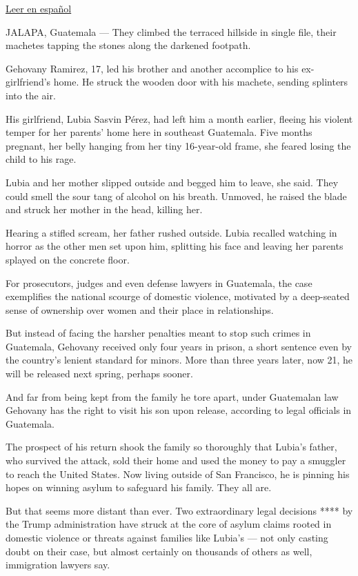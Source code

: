 \href{https://www.nytimes.com/es/2019/08/19/espanol/america-latina/guatemala-migrantes-mujeres-violencia.html}{Leer
en español}

JALAPA, Guatemala --- They climbed the terraced hillside in single file,
their machetes tapping the stones along the darkened footpath.

Gehovany Ramirez, 17, led his brother and another accomplice to his
ex-girlfriend's home. He struck the wooden door with his machete,
sending splinters into the air.

His girlfriend, Lubia Sasvin Pérez, had left him a month earlier,
fleeing his violent temper for her parents' home here in southeast
Guatemala. Five months pregnant, her belly hanging from her tiny
16-year-old frame, she feared losing the child to his rage.

Lubia and her mother slipped outside and begged him to leave, she said.
They could smell the sour tang of alcohol on his breath. Unmoved, he
raised the blade and struck her mother in the head, killing her.

Hearing a stifled scream, her father rushed outside. Lubia recalled
watching in horror as the other men set upon him, splitting his face and
leaving her parents splayed on the concrete floor.

For prosecutors, judges and even defense lawyers in Guatemala, the case
exemplifies the national scourge of domestic violence, motivated by a
deep-seated sense of ownership over women and their place in
relationships.

But instead of facing the harsher penalties meant to stop such crimes in
Guatemala, Gehovany received only four years in prison, a short sentence
even by the country's lenient standard for minors. More than three years
later, now 21, he will be released next spring, perhaps sooner.

And far from being kept from the family he tore apart, under Guatemalan
law Gehovany has the right to visit his son upon release, according to
legal officials in Guatemala.

The prospect of his return shook the family so thoroughly that Lubia's
father, who survived the attack, sold their home and used the money to
pay a smuggler to reach the United States. Now living outside of San
Francisco, he is pinning his hopes on winning asylum to safeguard his
family. They all are.

But that seems more distant than ever. Two extraordinary legal decisions
**** by the Trump administration have struck at the core of asylum
claims rooted in domestic violence or threats against families like
Lubia's --- not only casting doubt on their case, but almost certainly
on thousands of others as well, immigration lawyers say.

